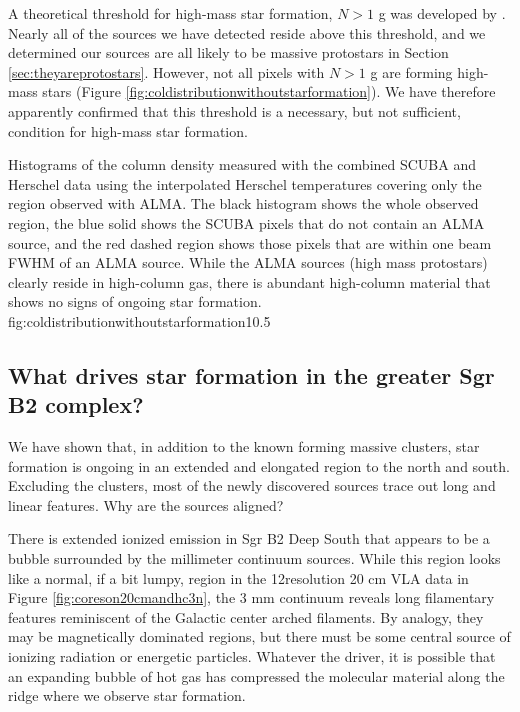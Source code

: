 \documentclass[twocolumn]{aastex61}
\begin{document}
A theoretical threshold for high-mass star formation, $N > 1$ g \persc was
developed by \citet{Krumholz2008a}.   Nearly all of the sources we have
detected reside above this threshold, and we determined our sources are all
likely to be massive protostars in Section \ref{sec:theyareprotostars}.
However, not all pixels with $N > 1$ g \persc are forming high-mass stars
(Figure \ref{fig:coldistributionwithoutstarformation}).  We
have therefore apparently confirmed that this threshold is a necessary, but not
sufficient, condition for high-mass star formation.



{Histograms of the column density measured with the combined SCUBA and Herschel
data using the interpolated Herschel temperatures covering only the region
observed with ALMA.  The black histogram shows the whole observed region,
the blue solid shows the SCUBA pixels that do not contain an ALMA source,
and the red dashed region shows those pixels that are within one beam
FWHM of an ALMA source.  While the ALMA sources (high mass protostars)
clearly reside in high-column gas, there is abundant high-column material
that shows no signs of ongoing star formation.}
{fig:coldistributionwithoutstarformation}{1}{0.5\textwidth}

\subsection{What drives star formation in the greater Sgr B2 complex?}
\label{sec:whatdrives}
We have shown that, in addition to the known forming massive clusters,
star formation is ongoing in an extended and elongated region to the north
and south.  Excluding the clusters, most of the newly discovered sources
trace out long and linear features.  Why are the sources aligned?

There is extended ionized emission in Sgr B2 Deep South that appears to be a
bubble surrounded by the millimeter continuum sources.  While this region looks
like a normal, if a bit lumpy, \hii region in the 12\arcsec resolution 20 cm
VLA data in Figure \ref{fig:coreson20cmandhc3n}, the 3 mm continuum reveals long
filamentary features reminiscent of the Galactic center arched filaments.  By
analogy, they may be magnetically dominated regions, but there must be some
central source of ionizing radiation or energetic particles.  Whatever the
driver, it is possible that an expanding bubble of hot gas has compressed
the molecular material along the ridge where we observe star formation.
\end{document}
